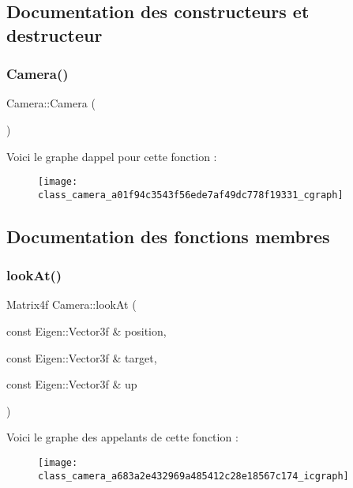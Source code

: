 \subsection{Documentation des constructeurs et destructeur}
\mbox{\label{class_camera_a01f94c3543f56ede7af49dc778f19331}} 
\subsubsection{\texorpdfstring{Camera()}{Camera()}}
{\footnotesize\ttfamily Camera\+::\+Camera (\begin{DoxyParamCaption}{ }\end{DoxyParamCaption})\hspace{0.3cm}{\ttfamily [inline]}}

Voici le graphe d\textquotesingle{}appel pour cette fonction \+:\nopagebreak
\begin{figure}[H]
\begin{center}
\leavevmode
\texttt{[image: class\_camera\_a01f94c3543f56ede7af49dc778f19331\_cgraph]}
\end{center}
\end{figure}


\subsection{Documentation des fonctions membres}
\mbox{\label{class_camera_a683a2e432969a485412c28e18567c174}} 
\subsubsection{\texorpdfstring{look\+At()}{lookAt()}}
{\footnotesize\ttfamily Matrix4f Camera\+::look\+At (\begin{DoxyParamCaption}\item[{const Eigen\+::\+Vector3f \&}]{position,  }\item[{const Eigen\+::\+Vector3f \&}]{target,  }\item[{const Eigen\+::\+Vector3f \&}]{up }\end{DoxyParamCaption})\hspace{0.3cm}{\ttfamily [static]}}

Voici le graphe des appelants de cette fonction \+:\nopagebreak
\begin{figure}[H]
\begin{center}
\leavevmode
\texttt{[image: class\_camera\_a683a2e432969a485412c28e18567c174\_icgraph]}
\end{center}
\end{figure}
\mbox{\label{class_camera_aa63f48a3280871eba3a6f74a3c0f2e2e}} 

